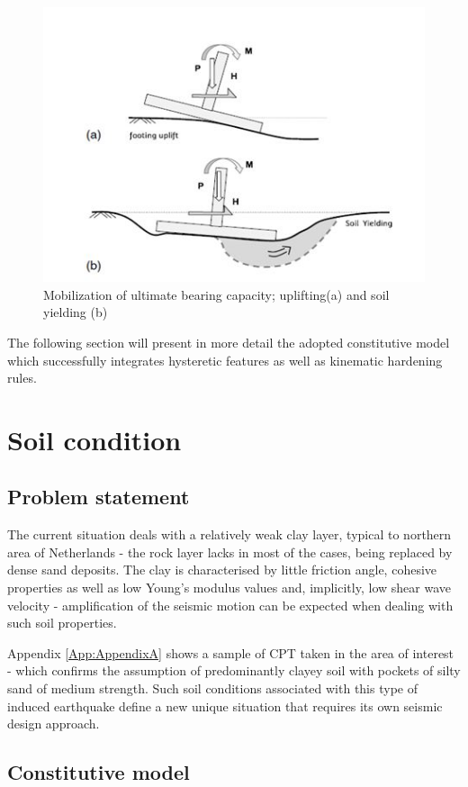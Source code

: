 \documentclass[11pt,a4paper]{report}
\begin{document}
\begin{figure}[h!]
	\centering
	\includegraphics[width=0.8\linewidth]{"uplift"}
	\caption{Mobilization of ultimate bearing capacity; uplifting(a) and soil yielding (b)}
	\label{uplift}
\end{figure}

The following section will present in more detail the adopted constitutive model which successfully integrates hysteretic features as well as kinematic hardening rules.

\newpage
\section{Soil condition}
\subsection{Problem statement}
The current situation deals with a relatively weak clay layer, typical to northern area of Netherlands - the rock layer lacks in most of the cases, being replaced by dense sand deposits. The clay is characterised by little friction angle, cohesive properties as well as low Young's modulus values and, implicitly, low shear wave velocity - amplification of the seismic motion can be expected when dealing with such soil properties.

Appendix \ref{App:AppendixA} shows a sample of CPT taken in the area of interest - which confirms the assumption of predominantly clayey soil with pockets of silty sand of medium strength. Such soil conditions associated with this type of induced earthquake define a new unique situation that requires its own seismic design approach.

\subsection{Constitutive model}
\end{document}
